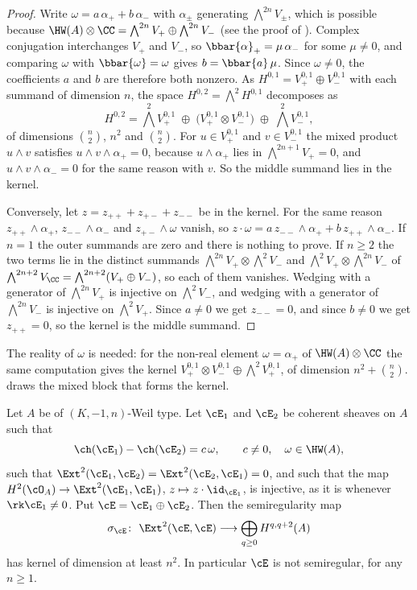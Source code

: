 \begin{proof}
Write $\omega=a\,\alpha_{+}+b\,\alpha_{-}$ with $\alpha_{\pm}$ generating
$\bigwedge^{2n}V_{\pm}$, which is possible because
$\HW(A)\otimes\CC=\bigwedge^{2n}V_{+}\oplus\bigwedge^{2n}V_{-}$ (see the proof
of ). Complex conjugation interchanges $V_{+}$ and
$V_{-}$, so $\bbar{\alpha}_{+}=\mu\,\alpha_{-}$ for some $\mu\ne0$, and
comparing $\omega$ with $\bbar{\omega}=\omega$ gives $b=\bbar{a}\,\mu$. Since
$\omega\ne0$, the coefficients $a$ and $b$ are therefore both nonzero. As
$H^{0,1}=V_{+}^{0,1}\oplus V_{-}^{0,1}$ with each summand of dimension $n$,
the space $H^{0,2}=\bigwedge^{2}H^{0,1}$ decomposes as
\[
  H^{0,2}
  =\textstyle\bigwedge^{2}V_{+}^{0,1}
  \;\oplus\;\bigl(V_{+}^{0,1}\otimes V_{-}^{0,1}\bigr)
  \;\oplus\;\bigwedge^{2}V_{-}^{0,1},
\]
of dimensions $\binom{n}{2}$, $n^{2}$ and $\binom{n}{2}$.
For $u\in V_{+}^{0,1}$ and $v\in V_{-}^{0,1}$ the mixed product $u\wedge v$
satisfies $u\wedge v\wedge\alpha_{+}=0$, because $u\wedge\alpha_{+}$ lies in
$\bigwedge^{2n+1}V_{+}=0$, and $u\wedge v\wedge\alpha_{-}=0$ for the same
reason with $v$. So the middle summand lies in the kernel.

Conversely, let $z=z_{++}+z_{+-}+z_{--}$ be in the kernel. For the same
reason $z_{++}\wedge\alpha_{+}$, $z_{--}\wedge\alpha_{-}$ and
$z_{+-}\wedge\omega$ vanish, so
$z\cdot\omega=a\,z_{--}\wedge\alpha_{+}+b\,z_{++}\wedge\alpha_{-}$. If $n=1$
the outer summands are zero and there is nothing to prove. If $n\ge2$ the two
terms lie in the distinct summands
$\bigwedge^{2n}V_{+}\otimes\bigwedge^{2}V_{-}$ and
$\bigwedge^{2}V_{+}\otimes\bigwedge^{2n}V_{-}$ of
$\bigwedge^{2n+2}V_{\CC}=\bigwedge^{2n+2}(V_{+}\oplus V_{-})$, so each of them
vanishes. Wedging with a generator of $\bigwedge^{2n}V_{+}$ is injective on
$\bigwedge^{2}V_{-}$, and wedging with a generator of $\bigwedge^{2n}V_{-}$ is
injective on $\bigwedge^{2}V_{+}$. Since $a\neq0$ we get $z_{--}=0$, and since
$b\neq0$ we get $z_{++}=0$, so the kernel is the middle summand.
\end{proof}

The reality of $\omega$ is needed: for the non-real element
$\omega=\alpha_{+}$ of $\HW(A)\otimes\CC$ the same computation gives the
kernel $V_{+}^{0,1}\otimes V_{-}^{0,1}\oplus\bigwedge^{2}V_{+}^{0,1}$, of
dimension $n^{2}+\binom{n}{2}$.  draws the mixed block that forms the kernel.

\begin{theorem}
\label{thm:rankzero}
Let $A$ be of $(K,-1,n)$-Weil type. Let $\cE_{1}$ and $\cE_{2}$ be coherent
sheaves on $A$ such that
\[
  \ch(\cE_{1})-\ch(\cE_{2})=c\,\omega,\qquad c\neq0,\quad \omega\in\HW(A),
\]
such that $\Ext^{2}(\cE_{1},\cE_{2})=\Ext^{2}(\cE_{2},\cE_{1})=0$, and such
that the map $H^{2}(\cO_{A})\to\Ext^{2}(\cE_{1},\cE_{1})$,
$z\mapsto z\cdot\id_{\cE_{1}}$, is injective, as it is whenever
$\rk\cE_{1}\neq0$. Put $\cE=\cE_{1}\oplus\cE_{2}$. Then the semiregularity
map
\[
  \sigma_{\cE}\colon\ \Ext^{2}(\cE,\cE)\longrightarrow\bigoplus_{q\ge0}H^{q,q+2}(A)
\]
has kernel of dimension at least $n^{2}$. In particular $\cE$ is not
semiregular, for any $n\ge1$.
\end{theorem}

